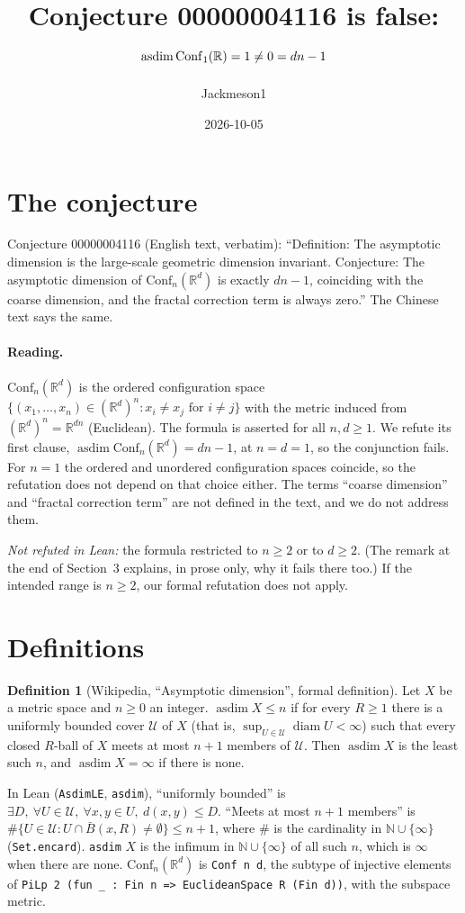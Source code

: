 \documentclass[11pt]{article}
\title{Conjecture 00000004116 is false:\\ $\asdim \mathrm{Conf}_1(\mathbb R)=1\neq 0=dn-1$}
\author{Jackmeson1}
\date{2026-10-05}
\theoremstyle{definition}
\newtheorem{definition}[theorem]{Definition}
\DeclareMathOperator{\asdim}{asdim}
\begin{document}
\maketitle

\section{The conjecture}
Conjecture 00000004116 (English text, verbatim): ``Definition: The asymptotic dimension is the
large-scale geometric dimension invariant. Conjecture: The asymptotic dimension of
$\mathrm{Conf}_n(\mathbb R^d)$ is exactly $dn - 1$, coinciding with the coarse dimension, and the
fractal correction term is always zero.'' The Chinese text says the same.

\paragraph{Reading.} $\mathrm{Conf}_n(\mathbb R^d)$ is the ordered configuration space
$\{(x_1,\dots,x_n)\in(\mathbb R^d)^n : x_i\ne x_j \text{ for } i\ne j\}$ with the metric induced from
$(\mathbb R^d)^n=\mathbb R^{dn}$ (Euclidean). The formula is asserted for all $n,d\ge1$. We refute
its first clause, $\asdim\mathrm{Conf}_n(\mathbb R^d)=dn-1$, at $n=d=1$, so the conjunction fails.
For $n=1$ the ordered and unordered configuration spaces coincide, so the refutation does not depend
on that choice either. The terms ``coarse dimension'' and ``fractal correction term'' are not
defined in the text, and we do not address them.

\emph{Not refuted in Lean:} the formula restricted to $n\ge2$ or to $d\ge2$. (The remark at the end
of Section~3 explains, in prose only, why it fails there too.) If the intended range is $n\ge 2$,
our formal refutation does not apply.

\section{Definitions}
\begin{definition}[Wikipedia, ``Asymptotic dimension'', formal definition]
Let $X$ be a metric space and $n\ge0$ an integer. $\asdim X\le n$ if for every $R\ge1$ there is a
uniformly bounded cover $\mathcal U$ of $X$ (that is, $\sup_{U\in\mathcal U}\operatorname{diam}U<\infty$)
such that every closed $R$-ball of $X$ meets at most $n+1$ members of $\mathcal U$. Then $\asdim X$ is
the least such $n$, and $\asdim X=\infty$ if there is none.
\end{definition}
In Lean (\texttt{AsdimLE}, \texttt{asdim}), ``uniformly bounded'' is
$\exists D,\ \forall U\in\mathcal U,\ \forall x,y\in U,\ d(x,y)\le D$. ``Meets at most $n+1$
members'' is $\#\{U\in\mathcal U : U\cap \bar B(x,R)\ne\emptyset\}\le n+1$, where $\#$ is the
cardinality in $\mathbb N\cup\{\infty\}$ (\texttt{Set.encard}). \texttt{asdim} $X$ is the infimum in
$\mathbb N\cup\{\infty\}$ of all such $n$, which is $\infty$ when there are none. $\mathrm{Conf}_n(\mathbb R^d)$
is \texttt{Conf n d}, the subtype of injective elements of
\texttt{PiLp 2 (fun \_ : Fin n => EuclideanSpace R (Fin d))}, with the subspace metric.
\end{document}
